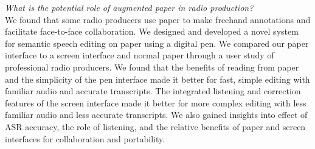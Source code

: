 \noindent
\hangindent=15pt
\textit{What is the potential role of augmented paper in radio production?}
\\

We found that some radio producers use paper to make freehand annotations and facilitate face-to-face collaboration.
We designed and developed a novel system for semantic speech editing on paper using a digital pen. We compared our
paper interface to a screen interface and normal paper through a user study of professional radio producers. We found
that the benefits of reading from paper and the simplicity of the pen interface made it better for fast, simple editing
with familiar audio and accurate transcripts.  The integrated listening and correction features of the screen interface
made it better for more complex editing with less familiar audio and less accurate transcripts.  We also gained
insights into effect of ASR accuracy, the role of listening, and the relative benefits of paper and screen interfaces
for collaboration and portability.
\\








